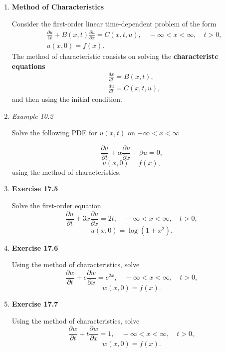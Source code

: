 \begin{enumerate}


\item \textbf{Method of Characteristics}

Consider the first-order linear time-dependent problem of the form
\[
\begin{aligned}
    & \frac{\partial u}{\partial t} + B(x,t)\frac{\partial u}{\partial x} = C(x,t,u) , \quad -\infty<x<\infty, \quad t>0, \\
    & u(x,0)=f(x).
\end{aligned}
\]
The method of characteristic consists on solving the \textbf{characteristc equations}
\[
\begin{aligned}
    & \frac{d x}{d t} = B(x,t),\\
    & \frac{d u}{d t} = C(x,t,u),
\end{aligned}
\]
and then using the initial condition.


\item \textit{Example 10.2}

Solve the following PDE for $u(x, t)$ on $-\infty<x<\infty$

\[\frac{\partial u}{\partial t} + \alpha \frac{\partial u}{\partial x} + \beta u = 0,\]
\[u(x,0)=f(x),\]
using the method of characteristics.


\newpage

\item \textbf{Exercise 17.5}

Solve the first-order equation
\[\frac{\partial u}{\partial t} + 3x \frac{\partial u}{\partial x} = 2t, \quad -\infty<x<\infty, \quad t>0,\]
\[u(x, 0) = \log(1 + x^{ 2} ).\]


\newpage


\item \textbf{Exercise 17.6}

Using the method of characteristics, solve
\[\frac{\partial w}{\partial t} + c \frac{\partial w}{\partial x} = e^{2x}, \quad -\infty<x<\infty, \quad t>0,\]
\[w(x, 0) = f(x).\]

\newpage


\item \textbf{Exercise 17.7}

Using the method of characteristics, solve
\[\frac{\partial w}{\partial t} + t \frac{\partial w}{\partial x} = 1, \quad -\infty<x<\infty, \quad t>0,\]
\[w(x, 0) = f(x).\]


\newpage


\newpage


\end{enumerate}
